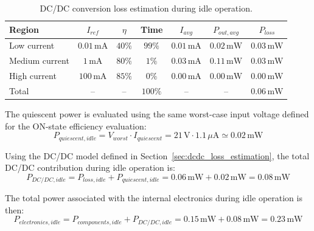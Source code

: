 \begin{table}[H]
	\centering
	\small
	\caption{DC/DC conversion loss estimation during idle operation.}
	\label{tab:idle_dcdc_loss_estimation}
	\begin{tabular}{@{}l c c c c c c@{}}
		\toprule
		\textbf{Region} & \textbf{\(I_{ref}\)} & \textbf{\(\eta\)} & \textbf{Time} & \textbf{\(I_{avg}\)} & \textbf{\(P_{out,avg}\)} & \textbf{\(P_{loss}\)} \\
		\midrule
		Low current &
		\(0.01\,\mathrm{mA}\) &
		\(40\%\) &
		\(99\%\) &
		\(0.01\,\mathrm{mA}\) &
		\(0.02\,\mathrm{mW}\) &
		\(0.03\,\mathrm{mW}\) \\
		
		Medium current &
		\(1\,\mathrm{mA}\) &
		\(80\%\) &
		\(1\%\) &
		\(0.03\,\mathrm{mA}\) &
		\(0.11\,\mathrm{mW}\) &
		\(0.03\,\mathrm{mW}\) \\
		
		High current &
		\(100\,\mathrm{mA}\) &
		\(85\%\) &
		\(0\%\) &
		\(0.00\,\mathrm{mA}\) &
		\(0.00\,\mathrm{mW}\) &
		\(0.00\,\mathrm{mW}\) \\
		\midrule
		Total &
		-- &
		-- &
		\(100\%\) &
		-- &
		-- &
		\(0.06\,\mathrm{mW}\) \\
		\bottomrule
	\end{tabular}
\end{table}

The quiescent power is evaluated using the same worst-case input voltage defined for the ON-state efficiency evaluation:
\begin{equation}
	\label{eq:idle_p_quiescent}
	P_{quiescent,idle} = V_{worst} \cdot I_{quiescent}
	= 21\,\mathrm{V} \cdot 1.1\,\mu\mathrm{A}
	\simeq 0.02\,\mathrm{mW}
\end{equation}

Using the DC/DC model defined in Section~\ref{sec:dcdc_loss_estimation}, the total DC/DC contribution during idle operation is:
\begin{equation}
	\label{eq:idle_p_dcdc}
	P_{DC/DC,idle} = P_{loss,idle} + P_{quiescent,idle}
	= 0.06\,\mathrm{mW} + 0.02\,\mathrm{mW}
	= 0.08\,\mathrm{mW}
\end{equation}

The total power associated with the internal electronics during idle operation is then:
\begin{equation}
	\label{eq:idle_p_electronics}
	P_{electronics,idle} = P_{components,idle} + P_{DC/DC,idle}
	= 0.15\,\mathrm{mW} + 0.08\,\mathrm{mW}
	= 0.23\,\mathrm{mW}
\end{equation}

